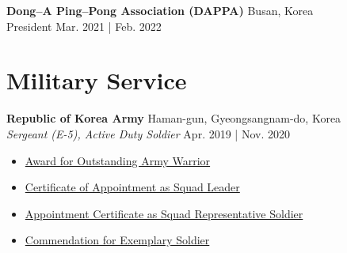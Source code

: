 \documentclass[a4paper,9pt]{extarticle}
\begin{document}
\noindent
\large{\textbf{Dong--A Ping--Pong Association (DAPPA)}}  \hfill Busan, Korea\\ %
President \hfill Mar. 2021 | Feb. 2022 \\%

\section*{Military Service}
\noindent
\textbf{\large{Republic of Korea Army}} \hfill Haman-gun, Gyeongsangnam-do, Korea \\
\textit{Sergeant (E-5), Active Duty Soldier} \hfill Apr. 2019 | Nov. 2020
\begin{itemize}
    \item \href{https://github.com/user-attachments/assets/584d8f84-5bbe-4a71-9ae3-bda5ce40bd6f}{Award for Outstanding Army Warrior}  
    \item \href{https://github.com/user-attachments/assets/d3b82b44-dff0-4d58-a944-747f46f8a50e}{Certificate of Appointment as Squad Leader}
    \item \href{https://github.com/user-attachments/assets/8565647d-3609-4866-8e18-fbdf9a9e227c}{Appointment Certificate as Squad Representative Soldier}
    \item \href{https://github.com/user-attachments/assets/f4f76912-92a7-440e-b8a2-4ce52b1ec39a}{Commendation for Exemplary Soldier}
\end{itemize}
\end{document}
